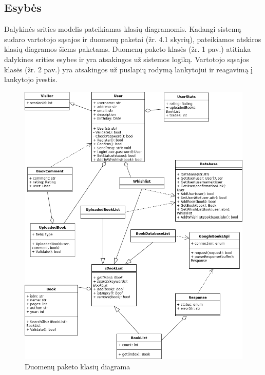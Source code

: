 \documentclass{VUMIFPSkursinis}
\begin{document}
	\subsection{Esybės}
		Dalykinės srities modelis pateikiamas klasių diagramomis.
		Kadangi sistemą sudaro vartotojo sąsajos ir duomenų paketai (žr. 4.1 skyrių),
		pateikiamos atskiros klasių diagramos šiems paketams.
		Duomenų paketo klasės (žr. 1 pav.) atitinka dalykines srities esybes ir yra atsakingos už
		sistemos logiką.
		Vartotojo sąsajos klasės (žr. 2 pav.) yra atsakingos už puslapių rodymą lankytojui ir reagavimą į
		lankytojo įvestis.
		\begin{figure}[H]
			\centering
			\includegraphics[scale=0.6]{img/Data-ClassDiagram.png}
			\caption{Duomenų paketo klasių diagrama}
			\label{img:psi2-data-class}
		\end{figure}
\end{document}
